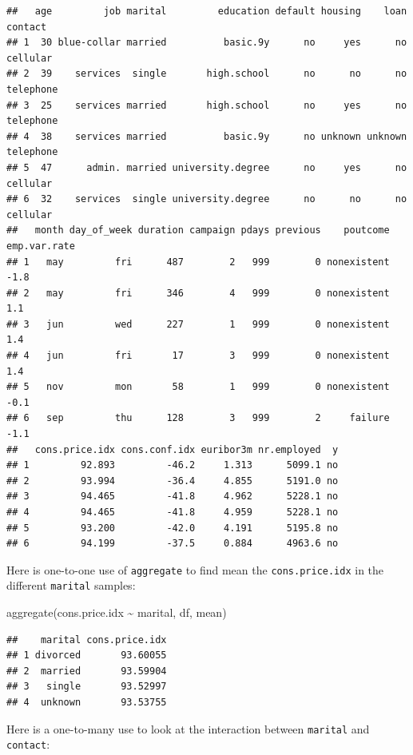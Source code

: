 \documentclass[
]{book}
\newenvironment{Shaded}{\begin{snugshade}}{\end{snugshade}}
\newcommand{\FunctionTok}[1]{\textcolor[rgb]{0.00,0.00,0.00}{#1}}
\newcommand{\NormalTok}[1]{#1}
\newcommand{\SpecialCharTok}[1]{\textcolor[rgb]{0.00,0.00,0.00}{#1}}
\begin{document}
\begin{verbatim}
##   age         job marital         education default housing    loan   contact
## 1  30 blue-collar married          basic.9y      no     yes      no  cellular
## 2  39    services  single       high.school      no      no      no telephone
## 3  25    services married       high.school      no     yes      no telephone
## 4  38    services married          basic.9y      no unknown unknown telephone
## 5  47      admin. married university.degree      no     yes      no  cellular
## 6  32    services  single university.degree      no      no      no  cellular
##   month day_of_week duration campaign pdays previous    poutcome emp.var.rate
## 1   may         fri      487        2   999        0 nonexistent         -1.8
## 2   may         fri      346        4   999        0 nonexistent          1.1
## 3   jun         wed      227        1   999        0 nonexistent          1.4
## 4   jun         fri       17        3   999        0 nonexistent          1.4
## 5   nov         mon       58        1   999        0 nonexistent         -0.1
## 6   sep         thu      128        3   999        2     failure         -1.1
##   cons.price.idx cons.conf.idx euribor3m nr.employed  y
## 1         92.893         -46.2     1.313      5099.1 no
## 2         93.994         -36.4     4.855      5191.0 no
## 3         94.465         -41.8     4.962      5228.1 no
## 4         94.465         -41.8     4.959      5228.1 no
## 5         93.200         -42.0     4.191      5195.8 no
## 6         94.199         -37.5     0.884      4963.6 no
\end{verbatim}

Here is one-to-one use of \texttt{aggregate} to find mean the \texttt{cons.price.idx} in the different \texttt{marital} samples:

\begin{Shaded}
\begin{Highlighting}[]
\FunctionTok{aggregate}\NormalTok{(cons.price.idx }\SpecialCharTok{\textasciitilde{}}\NormalTok{ marital, df, mean)}
\end{Highlighting}
\end{Shaded}

\begin{verbatim}
##    marital cons.price.idx
## 1 divorced       93.60055
## 2  married       93.59904
## 3   single       93.52997
## 4  unknown       93.53755
\end{verbatim}

Here is a one-to-many use to look at the interaction between \texttt{marital} and \texttt{contact}:
\end{document}
